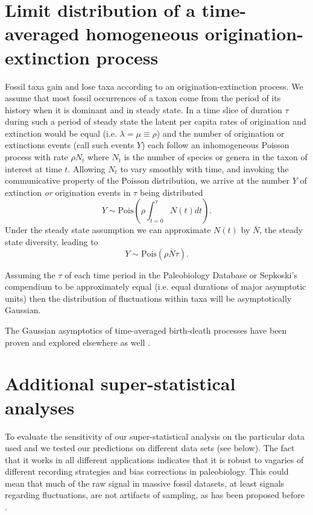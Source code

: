 \documentclass[12pt]{article}
\let\citep=\cite
\begin{document}
\clearpage

\newcommand{\beginsupplement}{%
  \setcounter{table}{0}
  \renewcommand{\thetable}{S\arabic{table}}%
  \setcounter{figure}{0}
  \renewcommand{\thefigure}{S\arabic{figure}}%
  \setcounter{section}{0}
  \renewcommand{\thesection}{S\arabic{section}}%
}

\beginsupplement

\section{Limit distribution of a time-averaged homogeneous
  origination-extinction process}
\label{sec:suppLimitDist}
Fossil taxa gain and lose taxa according to an origination-extinction
process. We assume that most fossil occurrences of a taxon come from
the period of its history when it is dominant and in steady state. In
a time slice of duration $\tau$ during such a period of steady state
the latent per capita rates of origination and extinction would be
equal (i.e. $\lambda = \mu \equiv \rho$) and the number of origination
or extinctions events (call such events $Y$) each follow an
inhomogeneous Poisson process with rate $\rho N_t$ where $N_t$ is the
number of species or genera in the taxon of interest at time
$t$. Allowing $N_t$ to vary smoothly with time, and invoking the
communicative property of the Poisson distribution, we arrive at the
number $Y$ of extinction \emph{or} origination events in $\tau$ being
distributed
\begin{equation}
  \label{eq:eventPois1}
  Y \sim \text{Pois}(\rho \int_{t=0}^\tau N(t) dt).
\end{equation}
Under the steady state assumption we can approximate $N(t)$ by
$\bar{N}$, the steady state diversity, leading to
\begin{equation}
  \label{eq:eventPois2}
  Y \sim \text{Pois}(\rho \bar{N} \tau).
\end{equation}

Assuming the $\tau$ of each time period in the Paleobiology Database
or Sepkoski's compendium to be approximately equal (i.e. equal
durations of major asymptotic units) then the distribution of
fluctuations within taxa will be asymptotically Gaussian.

The Gaussian asymptotics of time-averaged birth-death processes have
been proven and explored elsewhere as well \citep{keilson1970,
  grassmann1987}.

\section{Additional super-statistical analyses}
To evaluate the sensitivity of our super-statistical analysis on the
particular data used and we tested our predictions on different data
sets (see below). The fact that it works in all different applications
indicates that it is robust to vagaries of different recording
strategies and bias corrections in paleobiology. This could mean that
much of the raw signal in massive fossil datasets, at least signals
regarding fluctuations, are not artifacts of sampling, as has been
proposed before \citep{hannisdal2011}.
\end{document}
